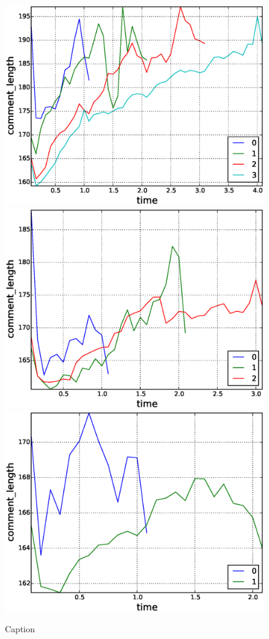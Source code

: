 \begin{figure}[!tb]
\includegraphics[scale=0.2]{./images/avr_comment_length_for_surviving_year_for_2011.eps}
\includegraphics[scale=0.2]{./images/avr_comment_length_for_surviving_year_for_2012.eps}
\includegraphics[scale=0.2]{./images/avr_comment_length_for_surviving_year_for_2013.eps}
\caption{Caption}
\label{fig:avr_comment_length_for_surviving_year}
\end{figure}

